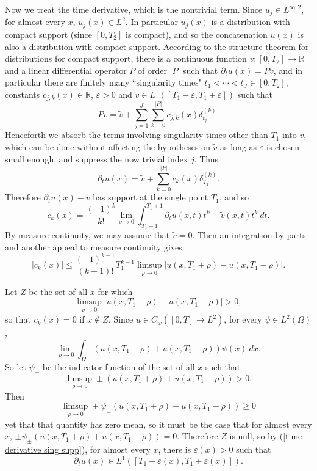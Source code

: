 \documentclass[10pt]{article}
\newcommand{\RR}{\mathbb{R}}
\theoremstyle{definition}
\begin{document}
Now we treat the time derivative, which is the nontrivial term.
Since $u_j \in L^{\infty,2}$, for almost every $x$, $u_j(x) \in L^2$.
In particular $u_j(x)$ is a distribution with compact support (since $[0, T_2]$ is compact), and so the concatenation $u(x)$ is also a distribution with compact support.
According to the structure theorem for distributions for compact support, there is a continuous function $v: [0, T_2] \to \RR$ and a linear differential operator $P$ of order $|P|$ such that $\partial_t u(x) = Pv$, and in particular there are finitely many ``singularity times" $t_1 < \cdots < t_J \in [0, T_2]$, constants $c_{j,k}(x) \in \RR$, $\varepsilon > 0$ and $\tilde v \in L^1([T_1 - \varepsilon, T_1 + \varepsilon])$ such that
$$Pv = \tilde v + \sum_{j=1}^J \sum_{k=0}^{|P|} c_{j,k}(x) \delta^{(k)}_{t_j}.$$
Henceforth we absorb the terms involving singularity times other than $T_1$ into $\tilde v$, which can be done without affecting the hypotheses on $\tilde v$ as long as $\varepsilon$ is chosen small enough, and suppress the now trivial index $j$.
Thus
\begin{equation}
\label{time derivative sing supp}
\partial_t u(x) = \tilde v + \sum_{k=0}^{|P|} c_k(x) \delta^{(k)}_{T_1}.
\end{equation}
Therefore $\partial_t u(x) - \tilde v$ has support at the single point $T_1$, and so
$$c_k(x) = \frac{(-1)^k}{k!} \lim_{\rho \to 0} \int_{T_1 - 1}^{T_1 + 1} \partial_t u(x, t)t^k - \tilde v(x, t) t^k ~dt.$$
By measure continuity, we may assume that $\tilde v = 0$. Then an integration by parts and another appeal to measure continuity gives
$$|c_k(x)| \leq \frac{(-1)^{k-1}}{(k-1)!}T_1^{k-1} \limsup_{\rho \to 0} |u(x, T_1+\rho) - u(x, T_1-\rho)|.$$

Let $Z$ be the set of all $x$ for which
$$\limsup_{\rho \to 0} |u(x, T_1+\rho) - u(x, T_1-\rho)| > 0,$$
so that $c_k(x) = 0$ if $x \notin Z$.
Since $u \in C_w([0, T] \to L^2)$, for every $\psi \in L^2(\Omega)$,
$$\lim_{\rho \to 0} \int_\Omega (u(x, T_1 + \rho) + u(x, T_1 - \rho))\psi(x) ~dx.$$
So let $\psi_\pm$ be the indicator function of the set of all $x$ such that
$$\limsup_{\rho \to 0} \pm(u(x, T_1 + \rho) + u(x, T_1 - \rho)) > 0.$$
Then
$$\limsup_{\rho \to 0} \pm \psi_\pm (u(x, T_1 + \rho) + u(x, T_1 - \rho)) \geq 0$$
yet that that quantity has zero mean, so it must be the case that for almost every $x$, $\pm \psi_\pm (u(x, T_1 + \rho) + u(x, T_1 - \rho)) = 0$.
Therefore $Z$ is null, so by (\ref{time derivative sing supp}), for almost every $x$, there is $\varepsilon(x) > 0$ such that
\begin{equation}
\label{time derivative is L1}
\partial_t u(x) \in L^1([T_1 - \varepsilon(x), T_1 + \varepsilon(x)]).
\end{equation}
\end{document}
